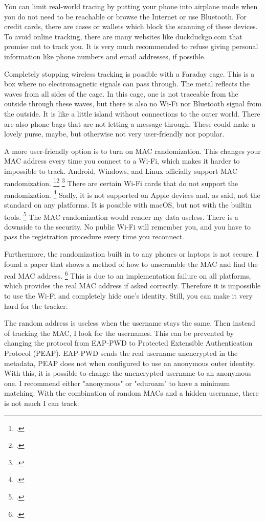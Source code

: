 \documentclass[paper=a4, fontsize=11pt]{article}
\begin{document}
You can limit real-world tracing by putting your phone into airplane mode when you do not need to be reachable or browse the Internet or use Bluetooth. For credit cards, there are cases or wallets which block the scanning of these devices. To avoid online tracking, there are many websites like duckduckgo.com that promise not to track you. It is very much recommended to refuse giving personal information like phone numbers and email addresses, if possible.

Completely stopping wireless tracking is possible with a Faraday cage. This is a box where no electromagnetic signals can pass through. The metal reflects the waves from all sides of the cage. In this cage, one is not traceable from the outside through these waves, but there is also no Wi-Fi nor Bluetooth signal from the outside. It is like a little island without connections to the outer world. There are also phone bags that are not letting a message through. These could make a lovely purse, maybe, but otherwise not very user-friendly nor popular.

A more user-friendly option is to turn on MAC randomization. This changes your MAC address every time you connect to a Wi-Fi, which makes it harder to impossible to track. Android, Windows, and Linux officially support MAC randomization. \footcite{randomwindows}\footcite{randomandroid} \footcite{randomlinux} There are certain Wi-Fi cards that do not support the randomization. \footcite{randomwin10} Sadly, it is not supported on Apple devices and, as said, not the standard on any platforms. It is possible with macOS, but not with the builtin tools. \footcite{randomapple} The MAC randomization would render my data useless. There is a downside to the security. No public Wi-Fi will remember you, and you have to pass the registration procedure every time you reconnect.

Furthermore, the randomization built in to any phones or laptops is not secure. I found a paper that shows a method of how to unscramble the MAC and find the real MAC address. \footcite{notrandom}
This is due to an implementation failure on all platforms, which provides the real MAC address if asked correctly. Therefore it is impossible to use the Wi-Fi and completely hide one's identity. Still, you can make it very hard for the tracker.

The random address is useless when the username stays the same. Then instead of tracking the MAC, I look for the usernames. This can be prevented by changing the protocol from EAP-PWD to Protected Extensible Authentication Protocol (PEAP). EAP-PWD sends the real username unencrypted in the metadata, PEAP does not  when configured to use an anonymous outer identity. With this, it is possible to change the unencrypted username to an anonymous one. I recommend either "anonymous" or "eduroam" to have a minimum matching. With the combination of random MACs and a hidden username, there is not much I can track.
\end{document}
